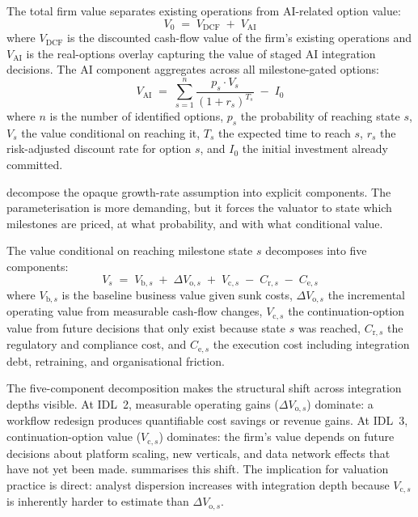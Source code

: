 \documentclass[oneside,10pt]{swissi}
\begin{document}
The total firm value separates existing operations from AI-related option value:
\begin{equation}\label{eq:v-total}
V_0 \;=\; V_{\mathrm{DCF}} \;+\; V_{\mathrm{AI}}
\end{equation}
where $V_{\mathrm{DCF}}$ is the discounted cash-flow value of the firm's existing operations and $V_{\mathrm{AI}}$ is the real-options overlay capturing the value of staged AI integration decisions. The AI component aggregates across all milestone-gated options:
\begin{equation}\label{eq:v-ai}
V_{\mathrm{AI}} \;=\; \sum_{s=1}^{n} \frac{p_s \cdot V_s}{(1+r_s)^{T_s}} \;-\; I_0
\end{equation}
where $n$ is the number of identified options, $p_s$ the probability of reaching state $s$, $V_s$ the value conditional on reaching it, $T_s$ the expected time to reach $s$, $r_s$ the risk-adjusted discount rate for option $s$, and $I_0$ the initial investment already committed.

 decompose the opaque growth-rate assumption into explicit components. The parameterisation is more demanding, but it forces the valuator to state which milestones are priced, at what probability, and with what conditional value.

The value conditional on reaching milestone state $s$ decomposes into five components:
\begin{equation}\label{eq:vs-decomp}
V_s \;=\; V_{\mathrm{b},s} \;+\; \Delta V_{\mathrm{o},s} \;+\; V_{\mathrm{c},s} \;-\; C_{\mathrm{r},s} \;-\; C_{\mathrm{e},s}
\end{equation}
where $V_{\mathrm{b},s}$ is the baseline business value given sunk costs, $\Delta V_{\mathrm{o},s}$ the incremental operating value from measurable cash-flow changes, $V_{\mathrm{c},s}$ the continuation-option value from future decisions that only exist because state $s$ was reached, $C_{\mathrm{r},s}$ the regulatory and compliance cost, and $C_{\mathrm{e},s}$ the execution cost including integration debt, retraining, and organisational friction.

The five-component decomposition makes the structural shift across integration depths visible. At IDL~2, measurable operating gains ($\Delta V_{\mathrm{o},s}$) dominate: a workflow redesign produces quantifiable cost savings or revenue gains. At IDL~3, continuation-option value ($V_{\mathrm{c},s}$) dominates: the firm's value depends on future decisions about platform scaling, new verticals, and data network effects that have not yet been made.  summarises this shift. The implication for valuation practice is direct: analyst dispersion increases with integration depth because $V_{\mathrm{c},s}$ is inherently harder to estimate than $\Delta V_{\mathrm{o},s}$.
\end{document}
